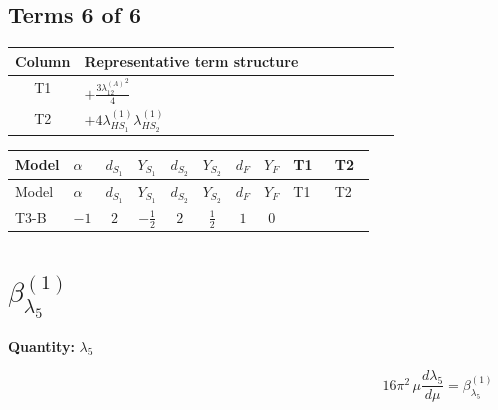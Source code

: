 \documentclass[8pt]{article}
\begin{document}
\begin{landscape}
\subsection*{Terms 6 of 6}
\begin{center}
\begin{tabular}{@{}c >{\raggedright\arraybackslash}p{0.82\linewidth}@{}}
\toprule
Column & Representative term structure \\
\midrule
T1 & \(\displaystyle +\frac{3 {\lambda_{12}^{(A)}}^2}{4}\) \\
\midrule
T2 & \(\displaystyle +4 {\lambda_{HS_1}^{(1)}} {\lambda_{HS_2}^{(1)}}\) \\
\midrule
\bottomrule
\end{tabular}
\end{center}
\smallskip
\tiny
\begin{longtable}{@{}llcccccc >{\raggedright\arraybackslash}p{0.21\linewidth} >{\raggedright\arraybackslash}p{0.21\linewidth}@{}}
\toprule
Model & $\alpha$ & $d_{S_1}$ & $Y_{S_1}$ & $d_{S_2}$ & $Y_{S_2}$ & $d_F$ & $Y_F$ & T1 & T2 \\
\midrule
\endfirsthead
\toprule
Model & $\alpha$ & $d_{S_1}$ & $Y_{S_1}$ & $d_{S_2}$ & $Y_{S_2}$ & $d_F$ & $Y_F$ & T1 & T2 \\
\midrule
\endhead
T3-B & $-1$ & $2$ & $-\frac{1}{2}$ & $2$ & $\frac{1}{2}$ & $1$ & $0$ & \scriptsize\adjustbox{max width=\linewidth}{$\begin{gathered} +\frac{3 {\lambda_{12}^{(A)}}^2}{4}\end{gathered}$} & \scriptsize\adjustbox{max width=\linewidth}{$\begin{gathered} +4 {\lambda_{HS_1}^{(1)}} {\lambda_{HS_2}^{(1)}}\end{gathered}$} \\
\midrule
\bottomrule
\end{longtable}
\clearpage
\section*{$\beta_{\lambda_5}^{(1)}$}
\noindent\textbf{Quantity: }$\lambda_5$\par\smallskip
\[16\pi^2\,\mu\frac{d \lambda_5}{d\mu}=\beta_{\lambda_5}^{(1)}\]

\end{landscape}
\end{document}
